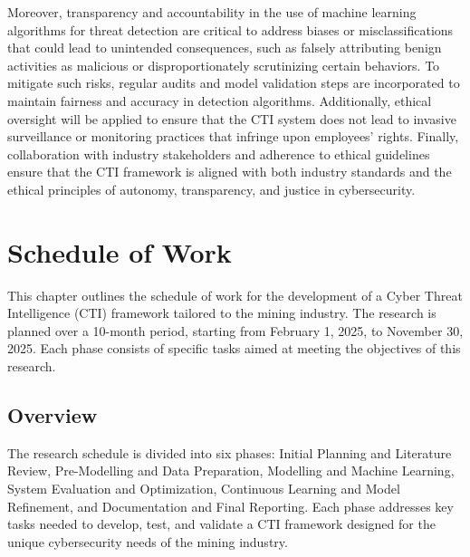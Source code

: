 \documentclass[a4paper,twoside,12pt]{report}
\begin{document}
Moreover, transparency and accountability in the use of machine learning algorithms for threat detection are critical to address biases or misclassifications that could lead to unintended consequences, such as falsely attributing benign activities as malicious or disproportionately scrutinizing certain behaviors. To mitigate such risks, regular audits and model validation steps are incorporated to maintain fairness and accuracy in detection algorithms. Additionally, ethical oversight will be applied to ensure that the CTI system does not lead to invasive surveillance or monitoring practices that infringe upon employees’ rights. Finally, collaboration with industry stakeholders and adherence to ethical guidelines ensure that the CTI framework is aligned with both industry standards and the ethical principles of autonomy, transparency, and justice in cybersecurity.

\chapter{Schedule of Work}

This chapter outlines the schedule of work for the development of a Cyber Threat Intelligence (CTI) framework tailored to the mining industry. The research is planned over a 10-month period, starting from February 1, 2025, to November 30, 2025. Each phase consists of specific tasks aimed at meeting the objectives of this research.

\section{Overview}

The research schedule is divided into six phases: Initial Planning and Literature Review, Pre-Modelling and Data Preparation, Modelling and Machine Learning, System Evaluation and Optimization, Continuous Learning and Model Refinement, and Documentation and Final Reporting. Each phase addresses key tasks needed to develop, test, and validate a CTI framework designed for the unique cybersecurity needs of the mining industry.
\end{document}
